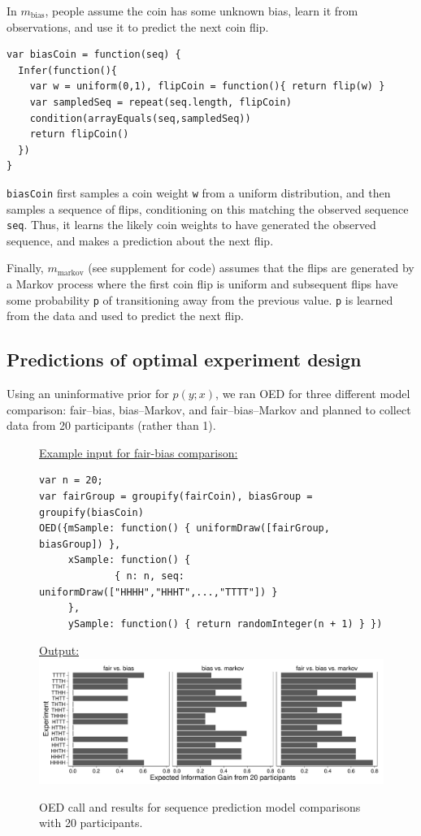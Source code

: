 \documentclass{article}
\begin{document}
In $m_{\text{bias}}$, people assume the coin has some unknown bias, learn it from observations, and use it to predict the next coin flip.
\begin{lstlisting}[upquote=true]
var biasCoin = function(seq) {
  Infer(function(){
    var w = uniform(0,1), flipCoin = function(){ return flip(w) }
    var sampledSeq = repeat(seq.length, flipCoin)
    condition(arrayEquals(seq,sampledSeq))
    return flipCoin()
  })
}
\end{lstlisting}
\lstinline{biasCoin} first samples a coin weight \lstinline{w} from a uniform distribution, and then samples a sequence of flips, conditioning on this matching the observed sequence \lstinline{seq}.
Thus, it learns the likely coin weights to have generated the observed sequence, and makes a prediction about the next flip.

Finally, $m_{\text{markov}}$ (see supplement for code) assumes that the flips are generated by a Markov process where the first coin flip is uniform and subsequent flips have some probability \lstinline{p} of transitioning away from the previous value.
\lstinline{p} is learned from the data and used to predict the next flip.


\subsection{Predictions of optimal experiment design}

Using an uninformative prior for $p(y; x)$, we ran OED for three different model comparison: fair--bias, bias--Markov, and fair--bias--Markov and planned to collect data from 20 participants (rather than 1).
\begin{figure}[t]
\underline{\textsf{Example input for fair-bias comparison:}}
\begin{lstlisting}
var n = 20;
var fairGroup = groupify(fairCoin), biasGroup = groupify(biasCoin)
OED({mSample: function() { uniformDraw([fairGroup, biasGroup]) },
     xSample: function() {
    		 { n: n, seq: uniformDraw(["HHHH","HHHT",...,"TTTT"]) }
   	 },
     ySample: function() { return randomInteger(n + 1) } })
\end{lstlisting}
\underline{\textsf{Output:}}\\
\includegraphics[width=\columnwidth]{img/coin_eig_n20_ignorance.pdf}
\caption{OED call and results for sequence prediction model comparisons with 20 participants.}
\label{fig:run-coin}
\end{figure}
\end{document}
